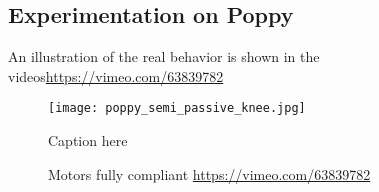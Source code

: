\subsection{Experimentation on Poppy} %

An illustration of the real behavior is shown in the videos\url{https://vimeo.com/63839782}

\begin{figure}[h]
    \begin{center}
        \texttt{[image: poppy\_semi\_passive\_knee.jpg]}
    \end{center}
    \caption{Caption here}
    \label{fig:figure1}
\end{figure}


\begin{figure}[!h]
\centering
    \hfil
    \caption{Motors fully compliant \url{https://vimeo.com/63839782}}
    \label{fig:}
\end{figure}



